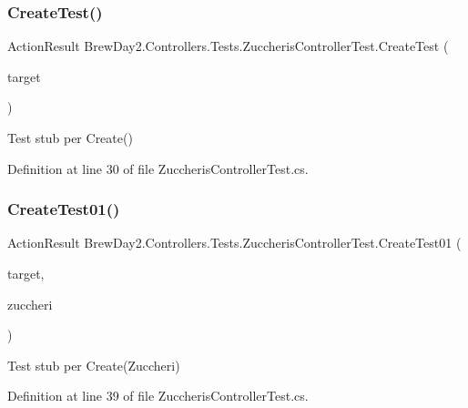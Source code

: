 \subsubsection{\texorpdfstring{Create\+Test()}{CreateTest()}}
{\footnotesize\ttfamily Action\+Result Brew\+Day2.\+Controllers.\+Tests.\+Zuccheris\+Controller\+Test.\+Create\+Test (\begin{DoxyParamCaption}\item[{\mbox{[}\+Pex\+Assume\+Under\+Test\mbox{]} \mbox{\hyperlink{class_brew_day2_1_1_controllers_1_1_zuccheris_controller}{Zuccheris\+Controller}}}]{target }\end{DoxyParamCaption})}



Test stub per Create()



Definition at line 30 of file Zuccheris\+Controller\+Test.\+cs.

\mbox{\label{class_brew_day2_1_1_controllers_1_1_tests_1_1_zuccheris_controller_test_a9f9722d1ab373649225ab01cab9fbb51}} 
\subsubsection{\texorpdfstring{Create\+Test01()}{CreateTest01()}}
{\footnotesize\ttfamily Action\+Result Brew\+Day2.\+Controllers.\+Tests.\+Zuccheris\+Controller\+Test.\+Create\+Test01 (\begin{DoxyParamCaption}\item[{\mbox{[}\+Pex\+Assume\+Under\+Test\mbox{]} \mbox{\hyperlink{class_brew_day2_1_1_controllers_1_1_zuccheris_controller}{Zuccheris\+Controller}}}]{target,  }\item[{\mbox{\hyperlink{class_brew_day2_1_1_models_1_1_zuccheri}{Zuccheri}}}]{zuccheri }\end{DoxyParamCaption})}



Test stub per Create(\+Zuccheri)



Definition at line 39 of file Zuccheris\+Controller\+Test.\+cs.

